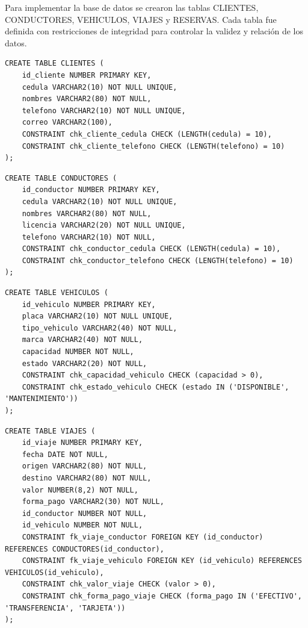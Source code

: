 \documentclass{article}
\begin{document}
Para implementar la base de datos se crearon las tablas CLIENTES, CONDUCTORES, VEHICULOS, VIAJES y RESERVAS. Cada tabla fue definida con restricciones de integridad para controlar la validez y relación de los datos.

\begin{lstlisting}[caption={Creación de la tabla CLIENTES}]
CREATE TABLE CLIENTES (
    id_cliente NUMBER PRIMARY KEY,
    cedula VARCHAR2(10) NOT NULL UNIQUE,
    nombres VARCHAR2(80) NOT NULL,
    telefono VARCHAR2(10) NOT NULL UNIQUE,
    correo VARCHAR2(100),
    CONSTRAINT chk_cliente_cedula CHECK (LENGTH(cedula) = 10),
    CONSTRAINT chk_cliente_telefono CHECK (LENGTH(telefono) = 10)
);
\end{lstlisting}

\begin{lstlisting}[caption={Creación de la tabla CONDUCTORES}]
CREATE TABLE CONDUCTORES (
    id_conductor NUMBER PRIMARY KEY,
    cedula VARCHAR2(10) NOT NULL UNIQUE,
    nombres VARCHAR2(80) NOT NULL,
    licencia VARCHAR2(20) NOT NULL UNIQUE,
    telefono VARCHAR2(10) NOT NULL,
    CONSTRAINT chk_conductor_cedula CHECK (LENGTH(cedula) = 10),
    CONSTRAINT chk_conductor_telefono CHECK (LENGTH(telefono) = 10)
);
\end{lstlisting}

\begin{lstlisting}[caption={Creación de la tabla VEHICULOS}]
CREATE TABLE VEHICULOS (
    id_vehiculo NUMBER PRIMARY KEY,
    placa VARCHAR2(10) NOT NULL UNIQUE,
    tipo_vehiculo VARCHAR2(40) NOT NULL,
    marca VARCHAR2(40) NOT NULL,
    capacidad NUMBER NOT NULL,
    estado VARCHAR2(20) NOT NULL,
    CONSTRAINT chk_capacidad_vehiculo CHECK (capacidad > 0),
    CONSTRAINT chk_estado_vehiculo CHECK (estado IN ('DISPONIBLE', 'MANTENIMIENTO'))
);
\end{lstlisting}

\begin{lstlisting}[caption={Creación de la tabla VIAJES}]
CREATE TABLE VIAJES (
    id_viaje NUMBER PRIMARY KEY,
    fecha DATE NOT NULL,
    origen VARCHAR2(80) NOT NULL,
    destino VARCHAR2(80) NOT NULL,
    valor NUMBER(8,2) NOT NULL,
    forma_pago VARCHAR2(30) NOT NULL,
    id_conductor NUMBER NOT NULL,
    id_vehiculo NUMBER NOT NULL,
    CONSTRAINT fk_viaje_conductor FOREIGN KEY (id_conductor) REFERENCES CONDUCTORES(id_conductor),
    CONSTRAINT fk_viaje_vehiculo FOREIGN KEY (id_vehiculo) REFERENCES VEHICULOS(id_vehiculo),
    CONSTRAINT chk_valor_viaje CHECK (valor > 0),
    CONSTRAINT chk_forma_pago_viaje CHECK (forma_pago IN ('EFECTIVO', 'TRANSFERENCIA', 'TARJETA'))
);
\end{lstlisting}
\end{document}

